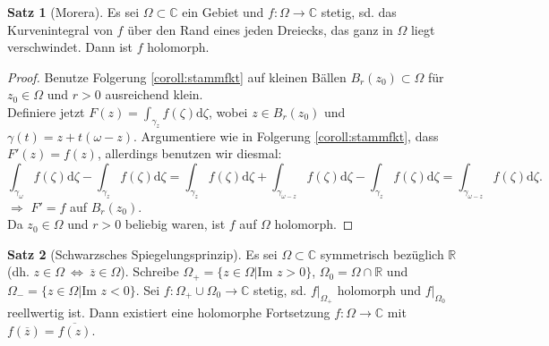 \documentclass[11pt,titlepage]{article}
\theoremstyle{definition}
\newtheorem{theorem}{Satz}[section]
\theoremstyle{remark}
\begin{document}
	\begin{theorem}[Morera]\label{thm:morera}
		Es sei $\Omega\subset\mathbb{C}$ ein Gebiet und $f:\Omega\to\mathbb{C}$ stetig, sd. das 
		Kurvenintegral von $f$ über den Rand eines jeden Dreiecks, das ganz in $\Omega$ liegt 
		verschwindet. Dann ist $f$ holomorph.
	\end{theorem}
	
	\begin{proof}
		Benutze Folgerung \ref{coroll:stammfkt} auf kleinen Bällen $B_r (z_0)\subset\Omega$ für 
		$z_0\in\Omega$ und $r>0$ ausreichend klein. \\
		Definiere jetzt $F(z)=\int_{\gamma_z}f(\zeta)\mathrm{d}\zeta$, wobei $z\in B_r (z_0)$ und 
		$\gamma (t)=z+t(\omega-z)$. Argumentiere wie in Folgerung \ref{coroll:stammfkt}, dass 
		$F'(z)=f(z)$, allerdings benutzen wir diesmal:
		\[ \int_{\gamma_{\omega}}f(\zeta)\mathrm{d}\zeta -\int_{\gamma_z}f(\zeta)\mathrm{d}\zeta 
		=\int_{\gamma_z}f(\zeta)\mathrm{d}\zeta +\int_{\gamma_{\omega -z}}f(\zeta)\mathrm{d}\zeta 
		-\int_{\gamma_z}f(\zeta)\mathrm{d}\zeta =\int_{\gamma_{\omega -z}}f(\zeta)\mathrm{d}\zeta. \]
		$\Rightarrow$ $F'=f$ auf $B_r (z_0)$. \\
		Da $z_0\in\Omega$ und $r>0$ beliebig waren, ist $f$ auf $\Omega$ holomorph.
	\end{proof}
	
	\begin{theorem}[Schwarzsches Spiegelungsprinzip]
		Es sei $\Omega\subset\mathbb{C}$ symmetrisch bezüglich $\mathbb{R}$ (dh. $z\in\Omega\ 
		\Leftrightarrow\ \overline{z}\in\Omega$). Schreibe $\Omega_+ =\{z\in\Omega | \text{Im } z >0\}$, 
		$\Omega_0 =\Omega\cap\mathbb{R}$ und $\Omega_- =\{z\in\Omega | \text{Im } z<0\}$.
		Sei $f:\Omega_+ \cup \Omega_0 \to\mathbb{C}$ stetig, sd. $f|_{\Omega_+}$ holomorph 
		und $f|_{\Omega_0}$ reellwertig ist. Dann existiert eine holomorphe Fortsetzung 
		$f:\Omega\to\mathbb{C}$ mit $f(\overline{z})=\overline{f(z)}$.
	\end{theorem}
	
\end{document}
